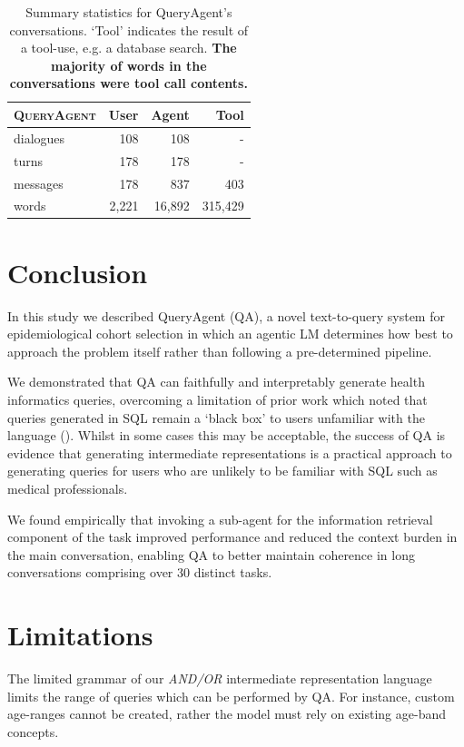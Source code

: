 \documentclass[11pt]{article}
\begin{document}
\begin{table}[ht]
\centering
\begin{tabular}{|l|r|r|r|}
\hline
\textsc{QueryAgent} & User & Agent & Tool \\
\hline
	dialogues	& 108 & 108    & -   \\
	turns       & 178 & 178    & -   \\
    	messages	& 178 & 837    & 403   \\
	words 		& 2,221 & 16,892 & 315,429 \\
\hline
\end{tabular}
\caption{
Summary statistics for QueryAgent's conversations.
`Tool' indicates the result of a tool-use, e.g. a database search.
\textbf{The majority of words in the conversations were tool call contents.}
}
\label{tab:conversation-statistics}
\end{table}

\section{Conclusion}
In this study we described QueryAgent (QA), a novel text-to-query system for epidemiological cohort selection in which an agentic LM determines how best to approach the problem itself rather than following a pre-determined pipeline.

We demonstrated that QA can faithfully and interpretably generate health informatics queries, overcoming a limitation of prior work which noted that queries generated in SQL remain a `black box' to users unfamiliar with the language  (\citet{ziletti_generating_2025}).
Whilst in some cases this may be acceptable, the success of QA is evidence that generating intermediate representations %
is a practical approach to generating queries for users who are unlikely to be familiar with SQL such as medical professionals.

We found empirically that invoking a sub-agent for the information retrieval component of the task improved performance and reduced the context burden in the main conversation, enabling QA to better maintain coherence in long conversations comprising over 30 distinct tasks.


\section{Limitations}
The limited grammar of our \textit{AND/OR} intermediate representation language limits the range of queries which can be performed by QA.
For instance, custom age-ranges cannot be created, rather the model must rely on existing age-band concepts.
\end{document}
